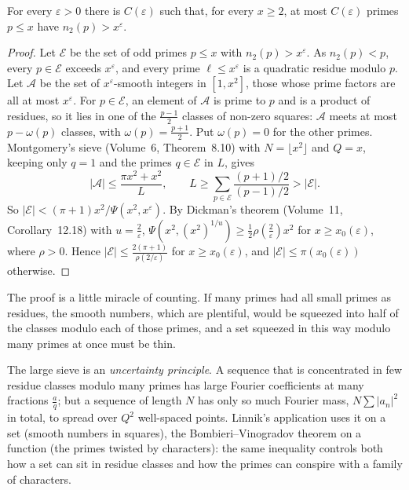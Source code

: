 \begin{theorem}[Linnik, 1941]\label{thm:linnik}
For every $\varepsilon>0$ there is $C(\varepsilon)$ such that, for every $x\ge2$, at most $C(\varepsilon)$ primes $p\le x$ have $n_2(p)>x^\varepsilon$.
\end{theorem}
\begin{proof}
Let $\mathcal E$ be the set of odd primes $p\le x$ with $n_2(p)>x^\varepsilon$. As $n_2(p)<p$, every $p\in\mathcal E$ exceeds $x^\varepsilon$, and every prime $\ell\le x^\varepsilon$ is a quadratic residue modulo $p$. Let $\mathcal A$ be the set of $x^\varepsilon$-smooth integers in $[1,x^2]$, those whose prime factors are all at most $x^\varepsilon$. For $p\in\mathcal E$, an element of $\mathcal A$ is prime to $p$ and is a product of residues, so it lies in one of the $\frac{p-1}2$ classes of non-zero squares: $\mathcal A$ meets at most $p-\omega(p)$ classes, with $\omega(p)=\frac{p+1}2$. Put $\omega(p)=0$ for the other primes. Montgomery's sieve (Volume~6, Theorem~8.10) with $N=\lfloor x^2\rfloor$ and $Q=x$, keeping only $q=1$ and the primes $q\in\mathcal E$ in $L$, gives
\[
|\mathcal A|\le\frac{\pi x^2+x^2}L,\qquad L\ge\sum_{p\in\mathcal E}\frac{(p+1)/2}{(p-1)/2}>|\mathcal E|.
\]
So $|\mathcal E|<(\pi+1)x^2/\Psi(x^2,x^\varepsilon)$. By Dickman's theorem (Volume~11, Corollary~12.18) with $u=\frac2\varepsilon$, $\Psi(x^2,(x^2)^{1/u})\ge\frac12\rho(\frac2\varepsilon)x^2$ for $x\ge x_0(\varepsilon)$, where $\rho>0$. Hence $|\mathcal E|\le\frac{2(\pi+1)}{\rho(2/\varepsilon)}$ for $x\ge x_0(\varepsilon)$, and $|\mathcal E|\le\pi(x_0(\varepsilon))$ otherwise.
\end{proof}

The proof is a little miracle of counting. If many primes had all small primes as residues, the smooth numbers, which are plentiful, would be squeezed into half of the classes modulo each of those primes, and a set squeezed in this way modulo many primes at once must be thin.

\begin{beauty}
The large sieve is an \emph{uncertainty principle}. A sequence that is concentrated in few residue classes modulo many primes has large Fourier coefficients at many fractions $\frac aq$; but a sequence of length $N$ has only so much Fourier mass, $N\sum|a_n|^2$ in total, to spread over $Q^2$ well-spaced points. Linnik's application uses it on a set (smooth numbers in squares), the Bombieri--Vinogradov theorem on a function (the primes twisted by characters): the same inequality controls both how a set can sit in residue classes and how the primes can conspire with a family of characters.
\end{beauty}


